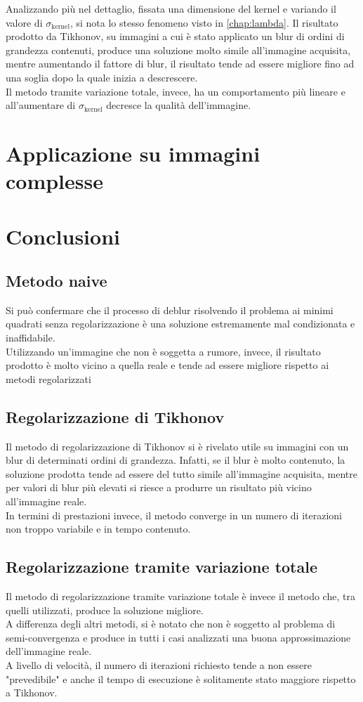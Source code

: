 \documentclass[11pt]{article}
\begin{document}
Analizzando più nel dettaglio, fissata una dimensione del kernel e variando il valore di $\sigma_{\text{kernel}}$, si nota lo stesso fenomeno visto in \autoref{chap:lambda}. 
Il risultato prodotto da Tikhonov, su immagini a cui è stato applicato un blur di ordini di grandezza contenuti, produce una soluzione molto simile all'immagine acquisita, 
mentre aumentando il fattore di blur, il risultato tende ad essere migliore fino ad una soglia dopo la quale inizia a descrescere.\\
Il metodo tramite variazione totale, invece, ha un comportamento più lineare e all'aumentare di $\sigma_{\text{kernel}}$ decresce la qualità dell'immagine.

\section{Applicazione su immagini complesse}


\section{Conclusioni}
\subsection{Metodo naive}
Si può confermare che il processo di deblur risolvendo il problema ai minimi quadrati senza regolarizzazione è una soluzione estremamente mal condizionata e inaffidabile.\\
Utilizzando un'immagine che non è soggetta a rumore, invece, il risultato prodotto è molto vicino a quella reale e tende ad essere migliore rispetto ai metodi regolarizzati

\subsection{Regolarizzazione di Tikhonov}
Il metodo di regolarizzazione di Tikhonov si è rivelato utile su immagini con un blur di determinati ordini di grandezza. 
Infatti, se il blur è molto contenuto, la soluzione prodotta tende ad essere del tutto simile all'immagine acquisita, mentre per valori di blur più elevati si riesce a produrre un risultato più vicino all'immagine reale.\\
In termini di prestazioni invece, il metodo converge in un numero di iterazioni non troppo variabile e in tempo contenuto.

\subsection{Regolarizzazione tramite variazione totale}
Il metodo di regolarizzazione tramite variazione totale è invece il metodo che, tra quelli utilizzati, produce la soluzione migliore.\\
A differenza degli altri metodi, si è notato che non è soggetto al problema di semi-convergenza e produce in tutti i casi analizzati una buona approssimazione dell'immagine reale.\\
A livello di velocità, il numero di iterazioni richiesto tende a non essere "prevedibile" e anche il tempo di esecuzione è solitamente stato maggiore rispetto a Tikhonov.\\

\newpage
\printbibliography[title={Bibliografia}]
\end{document}
